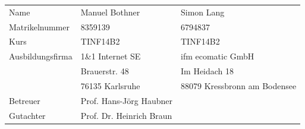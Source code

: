 \begin{flushleft}
	\begin{tabular}{p{4cm} p{6cm} p{6cm}}
		Name & Manuel Bothner & Simon Lang\\
		Matrikelnummer & 8359139 & 6794837\\
		Kurs & TINF14B2 & TINF14B2\\
		Ausbildungsfirma & 1\&1 Internet SE & ifm ecomatic GmbH\\
		& Brauerstr. 48 & Im Heidach 18\\
		& 76135 Karlsruhe & 88079 Kressbronn am Bodensee\\
		Betreuer & Prof. Hans-Jörg Haubner & \\
		Gutachter & Prof. Dr. Heinrich Braun & \\
	\end{tabular}
\end{flushleft}
